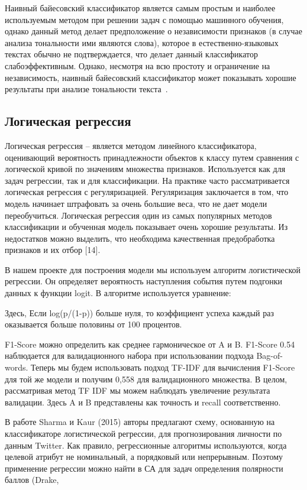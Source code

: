 Наивный байесовский классификатор является самым простым и наиболее
используемым методом при решении задач с помощью машинного обучения,
однако данный метод делает предположение о независимости признаков (в случае
анализа тональности ими являются слова), которое в естественно-языковых текстах
обычно не подтверждается, что делает данный классификатор слабоэффективным.
Однако, несмотря на всю простоту и ограничение на независимость, наивный
байесовский классификатор может показывать хорошие результаты при анализе
тональности текста~\cite{article9}.

\subsection{Логическая регрессия}

Логическая регрессия – является методом линейного классификатора, оценивающий
вероятность принадлежности объектов к классу путем сравнения с логической кривой
по значениям множества признаков. Используется как для задач регрессии, так и
для классификации.  На практике часто рассматривается логическая регрессия с
регуляризацией. Регуляризация заключается в том, что модель начинает штрафовать
за очень большие веса, что не дает модели переобучиться. Логическая регрессия
один из самых популярных методов классификации и обученная модель показывает
очень хорошие результаты. Из недостатков можно выделить, что необходима
качественная предобработка признаков и их отбор [14].~\cite{article9}

В нашем проекте для построения модели мы используем алгоритм логистической
регрессии. Он определяет вероятность наступления события путем подгонки данных к
функции logit. В алгоритме используется уравнение:

Здесь, Если log(p/(1-p)) больше нуля, то коэффициент успеха каждый раз
оказывается больше половины от 100 процентов.

F1-Score можно определить как среднее гармоническое от A и B. F1-Score 0.54
наблюдается для валидационного набора при использовании подхода Bag-of-words.
Теперь мы будем использовать подход TF-IDF для вычисления F1-Score для той же
модели и получим 0,558 для валидационного множества. В целом, рассматривая метод
TF IDF мы можем наблюдать увеличение результата валидации. Здесь A и B
представлены как точность и recall соответственно.~\cite{article12}


В работе Sharma и Kaur (2015) авторы предлагают схему, основанную на
классификаторе логистической регрессии, для прогнозирования личности по данным
Twitter.  Как правило, регрессионные алгоритмы используются, когда целевой
атрибут не номинальный, а порядковый или непрерывным. Поэтому применение
регрессии можно найти в СА для задач определения полярности баллов (Drake,
\cite{article13}

